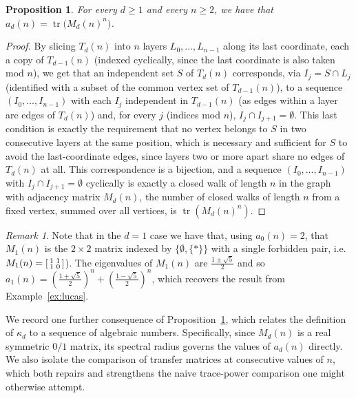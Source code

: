 \documentclass{article}
\theoremstyle{plain}
\newtheorem{proposition}[theorem]{Proposition}
\theoremstyle{definition}
\theoremstyle{remark}
\newtheorem{remark}[theorem]{Remark}
\DeclareMathOperator{\tr}{tr}
\begin{document}
\begin{proposition}\label{prop:trace}
For every $d\ge1$ and every $n\ge2$, we have that  $a_d(n)=\tr\big(M_d(n)^n\big)$.
\end{proposition}
\begin{proof}
By slicing $T_d(n)$ into $n$ layers $L_0,\dots,L_{n-1}$ along its last coordinate, each a copy of $T_{d-1}(n)$ (indexed cyclically, since the last coordinate is also taken mod $n$), we get that an independent set $S$ of $T_d(n)$ corresponds, via $I_j=S\cap L_j$ (identified with a subset of the common vertex set of $T_{d-1}(n)$), to a sequence $(I_0,\dots,I_{n-1})$ with each $I_j$ independent in $T_{d-1}(n)$ (as edges within a layer are edges of $T_d(n)$) and, for every $j$ (indices mod $n$), $I_j\cap I_{j+1}=\emptyset$. This last condition is exactly the requirement that no vertex belongs to $S$ in two consecutive layers at the same position, which is necessary and sufficient for $S$ to avoid the last-coordinate edges, since layers two or more apart share no edges of $T_d(n)$ at all. This correspondence is a bijection, and a sequence $(I_0,\dots,I_{n-1})$ with $I_j\cap I_{j+1}=\emptyset$ cyclically is exactly a closed walk of length $n$ in the graph with adjacency matrix $M_d(n)$, the number of closed walks of length $n$ from a fixed vertex, summed over all vertices, is $\tr(M_d(n)^n)$.
\end{proof}

\begin{remark}
    Note that in the $d=1$ case we have that, using $a_0(n)=2$, that $M_1(n)$ is the $2\times2$ matrix indexed by $\{\emptyset,\{*\}\}$ with a single forbidden pair, i.e.\ $M_1(n)=\begin{bsmallmatrix}1&1\\1&0\end{bsmallmatrix}$). The eigenvalues of $M_1(n)$ are $\frac{1\pm\sqrt{5}}{2}$ and so $a_1(n) = (\frac{1+\sqrt{5}}{2})^{n}+(\frac{1-\sqrt{5}}{2})^n$, which recovers the result from Example~\ref{ex:lucas}.
\end{remark}

We record one further consequence of Proposition~\ref{prop:trace}, which relates the definition of $\kappa_d$ to a sequence of algebraic numbers. Specifically, since $M_d(n)$ is a real symmetric $0/1$ matrix, its spectral radius governs the values of $a_d(n)$ directly. We also isolate the comparison of transfer matrices at consecutive values of $n$, which both repairs and strengthens the naive trace-power comparison one might otherwise attempt.
\end{document}
